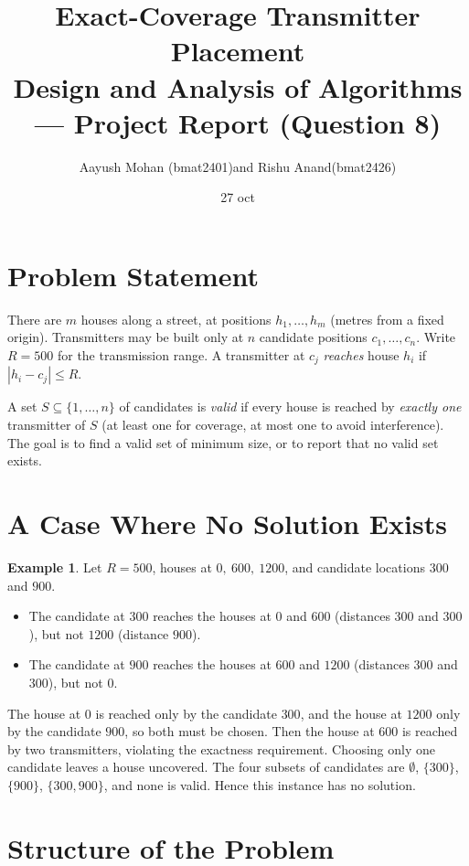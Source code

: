 \documentclass[11pt,a4paper]{article}
\title{Exact-Coverage Transmitter Placement\\[2pt]
\large Design and Analysis of Algorithms --- Project Report (Question 8)}
\author{Aayush Mohan (bmat2401)and Rishu Anand(bmat2426) }
\date{27 oct}
\theoremstyle{definition}
\newtheorem{example}{Example}
\begin{document}
\maketitle

\section{Problem Statement}

There are $m$ houses along a street, at positions $h_1,\dots,h_m$ (metres from a fixed origin).
Transmitters may be built only at $n$ candidate positions $c_1,\dots,c_n$.
Write $R = 500$ for the transmission range. A transmitter at $c_j$ \emph{reaches} house $h_i$ if $|h_i - c_j| \le R$.

A set $S \subseteq \{1,\dots,n\}$ of candidates is \emph{valid} if every house is reached by \emph{exactly one} transmitter of $S$
(at least one for coverage, at most one to avoid interference).
The goal is to find a valid set of minimum size, or to report that no valid set exists.



\section{A Case Where No Solution Exists}

\begin{example}
Let $R = 500$, houses at $0,\ 600,\ 1200$, and candidate locations $300$ and $900$.
\begin{itemize}[nosep]
  \item The candidate at $300$ reaches the houses at $0$ and $600$ (distances $300$ and $300$), but not $1200$ (distance $900$).
  \item The candidate at $900$ reaches the houses at $600$ and $1200$ (distances $300$ and $300$), but not $0$.
\end{itemize}
The house at $0$ is reached only by the candidate $300$, and the house at $1200$ only by the candidate $900$, so both must be chosen.
Then the house at $600$ is reached by two transmitters, violating the exactness requirement.
Choosing only one candidate leaves a house uncovered. The four subsets of candidates are $\emptyset$, $\{300\}$, $\{900\}$, $\{300,900\}$, and none is valid.
Hence this instance has no solution.
\end{example}

\section{Structure of the Problem}
\end{document}
